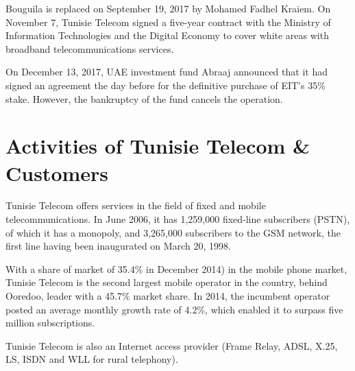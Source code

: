 Bouguila is replaced on September 19, 2017 by Mohamed Fadhel Kraiem. On November 7, Tunisie Telecom signed a five-year contract with the Ministry of Information Technologies and the Digital Economy to cover white areas with broadband telecommunications services.

On December 13, 2017, UAE investment fund Abraaj announced that it had signed an agreement the day before for the definitive purchase of EIT's 35\% stake. However, the bankruptcy of the fund cancels the operation.





{}




\section{Activities of Tunisie Telecom \& Customers}%

Tunisie Telecom offers services in the field of fixed and mobile telecommunications. 
In June 2006, it has 1,259,000 fixed-line subscribers (PSTN), of which it has a monopoly, and 3,265,000 subscribers to the GSM network, the first line having been inaugurated on March 20, 1998.

With a share of market of 35.4\% in December 2014) in the mobile phone market, Tunisie Telecom is the second largest mobile operator in the country, behind Ooredoo, leader with a 45.7\% market share. 
In 2014, the incumbent operator posted an average monthly growth rate of 4.2\%, which enabled it to surpass five million subscriptions. 

Tunisie Telecom is also an Internet access provider (Frame Relay, ADSL, X.25, LS, ISDN and WLL for rural telephony).

